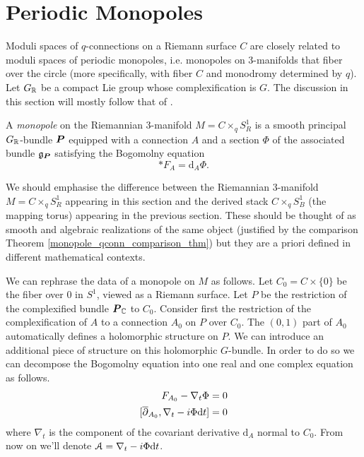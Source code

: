 \documentclass[10pt, oneside]{article}
\renewcommand{\d}{\mathrm{d}}
\begin{document}
\section{Periodic Monopoles}
Moduli spaces of $q$-connections on a Riemann surface $C$ are closely related to moduli spaces of periodic monopoles, i.e. monopoles on 3-manifolds that fiber over the circle (more specifically, with fiber $C$ and monodromy determined by $q$).  Let $G_{\mathbb{R}}$ be a compact Lie group whose complexification is $G$.  The discussion in this section will mostly follow that of \cite{CharbonneauHurtubise, Smith}.

\begin{definition}
A \emph{monopole} on the Riemannian 3-manifold $M = C \times_q S^1_R$ is a smooth principal $G_{\mathbb{R}}$-bundle $\boldsymbol{P}$ equipped with a connection $A$ and a section $\Phi$ of the associated bundle $\mathfrak{g}_{\boldsymbol{P}}$ satisfying the Bogomolny equation 
\[\ast F_A = \d_A \Phi.\]
\end{definition}

\begin{remark}
We should emphasise the difference between the Riemannian 3-manifold $M = C \times_q S^1_R$ appearing in this section and the derived stack $C \times_q S^1_B$ (the mapping torus) appearing in the previous section.  These should be thought of as smooth and algebraic realizations of the same object (justified by the comparison Theorem \ref{monopole_qconn_comparison_thm}) but they are a priori defined in different mathematical contexts.
\end{remark}



We can rephrase the data of a monopole on $M$ as follows.  Let $C_0 = C \times \{0\}$ be the fiber over $0$ in $S^1$, viewed as a Riemann surface.  Let $P$ be the restriction of the complexified bundle $\boldsymbol{P}_{\mathbb{C}}$ to $C_0$.  Consider first the restriction of the complexification of $A$ to a connection $A_0$ on $P$ over $C_0$.  The $(0,1)$ part of $A_0$ automatically defines a holomorphic structure on $P$.  We can introduce an additional piece of structure on this holomorphic $G$-bundle.  In order to do so we can decompose the Bogomolny equation into one real and one complex equation as follows.
\begin{align*}
F_{A_0} - \nabla_t \Phi &= 0 \\
[\ol{\del}_{A_0}, \nabla_t - i\Phi \d t] &= 0 
\end{align*}
where $\nabla_t$ is the component of the covariant derivative $\d_A$ normal to $C_0$.  From now on we'll denote $\mc A = \nabla_t - i\Phi \d t$.
\end{document}

